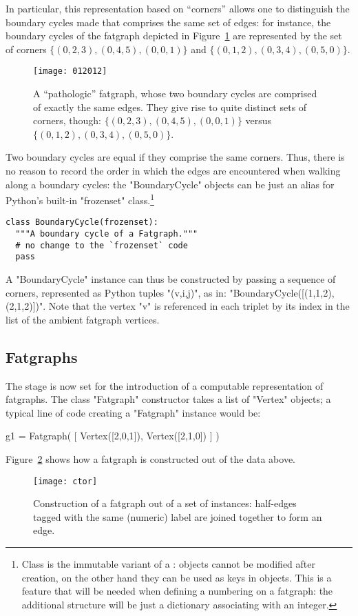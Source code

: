 In particular, this representation based on ``corners'' allows one to
distinguish the boundary cycles made that comprises the same set of
edges: for instance, the boundary cycles of the fatgraph depicted in
Figure~\ref{fig:012012} are represented by the set of corners $\{(0, 2, 3),
(0, 4, 5), (0, 0, 1)\}$ and $\{(0, 1, 2), (0, 3, 4), (0, 5, 0)\}$.
\begin{figure}
  \centering
  \texttt{[image: 012012]}
  \caption{A ``pathologic'' fatgraph, whose two boundary cycles are
    comprised of exactly the same edges. They give rise to quite
    distinct sets of corners, though: $\{(0, 2, 3), (0, 4, 5), (0, 0,
    1)\}$ versus $\{(0, 1, 2), (0, 3, 4), (0, 5, 0)\}$.}
  \label{fig:012012}
\end{figure}

Two boundary cycles are equal if they comprise the same corners.
Thus, there is no reason to record the order in which the edges are
encountered when walking along a boundary cycles: the "BoundaryCycle"
objects can be just an alias for Python's built-in "frozenset"
class.\footnote{Class  is the immutable variant of a
  :  objects cannot be modified after creation, on
  the other hand they can be used as keys in  objects.  This
  is a feature that will be needed when defining a numbering on a
  fatgraph: the additional structure will be just a dictionary
  associating  with an integer.}
\begin{lstlisting}
class BoundaryCycle(frozenset):
  """A boundary cycle of a Fatgraph."""
  # no change to the `frozenset` code
  pass 

\end{lstlisting}
A "BoundaryCycle" instance can thus be constructed by passing a
sequence of corners, represented as Python tuples "(v,i,j)", as in:
"BoundaryCycle([(1,1,2), (2,1,2)])".  Note that the vertex "v" is
referenced in each triplet by its index in the list of the ambient
fatgraph vertices.


\subsection{Fatgraphs}
\label{sec:Fatgraph}

The stage is now set for the introduction of a computable
representation of fatgraphs.  The class "Fatgraph" constructor takes a
list of "Vertex" objects; a typical line of code creating a "Fatgraph"
instance would be:
\begin{codexmp}
  g1 = Fatgraph( [ Vertex([2,0,1]), 
                   Vertex([2,1,0]) ] )
\end{codexmp}
Figure~\ref{fig:ctor} shows how a fatgraph is constructed out of the
data above.
\begin{figure}
  \centering
  \texttt{[image: ctor]}
  \caption{Construction of a fatgraph out of a set of
     instances: half-edges tagged with the same
    (numeric) label are joined together to form an edge.}
  \label{fig:ctor}
\end{figure}

